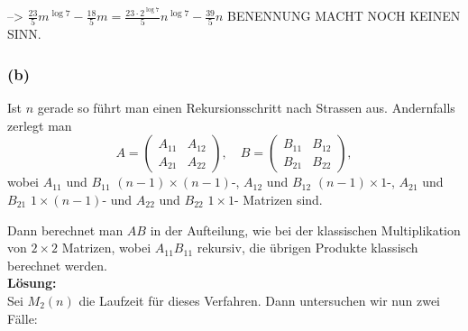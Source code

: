 \documentclass[11pt,a4paper,ngerman]{article}
\begin{document}
--> $\frac{23}{5}m^{\log 7} - \frac{18}{5}m = \frac{23\cdot 2^{\log 7}}{5} n^{\log 7} - \frac{39}{5}n$
BENENNUNG MACHT NOCH KEINEN SINN.



\subsubsection*{(b)}
Ist $n$ gerade so führt man einen Rekursionsschritt nach Strassen aus.
Andernfalls zerlegt man
$$
A = \left( \begin{array}{cc} A_{11} & A_{12}\\A_{21} & A_{22}\end{array} \right),
\quad
B = \left( \begin{array}{cc} B_{11} & B_{12}\\B_{21} & B_{22}\end{array} \right),
$$
wobei $A_{11}$ und $B_{11}$ $(n-1) \times (n-1)$-, $A_{12}$ und $B_{12}$ $(n-1)\times 1$-, $A_{21}$ und $B_{21}$ $1\times (n-1)$- und $A_{22}$ und $B_{22}$ $1 \times 1$- Matrizen sind.

Dann berechnet man $AB$ in der Aufteilung, wie bei der klassischen Multiplikation von $2\times 2$ Matrizen, wobei $A_{11}B_{11}$ rekursiv, die übrigen Produkte klassisch berechnet werden.\\

\textbf{Lösung:}\\
Sei $M_2(n)$ die Laufzeit für dieses Verfahren. Dann untersuchen wir nun zwei Fälle:
\end{document}
